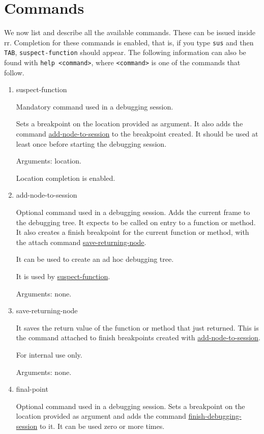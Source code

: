 \section{Commands}
We now list and describe all the available commands. These can be issued inside rr. Completion for these commands is enabled, that is, if you type \verb|sus| and then \verb|TAB|, \verb|suspect-function| should appear.
The following information can also be found with \verb|help <command>|, where \verb|<command>| is one of the commands that follow.

\begin{enumerate}
    \item suspect-function
\label{command:suspect-function}

Mandatory command used in a debugging session.

Sets a breakpoint on the location provided as argument. It also adds the command \hyperref[command:add-node-to-session]{add-node-to-session} to the breakpoint created.
It should be used at least once before starting the debugging session.

Arguments: location.

Location completion is enabled.

\item add-node-to-session
\label{command:add-node-to-session}

Optional command used in a debugging session.
Adds the current frame to the debugging tree.
It expects to be called on entry to a function or method.
It also creates a finish breakpoint for the current function or method, with the attach command \hyperref[command:save-returning-node]{save-returning-node}.

It can be used to create an ad hoc debugging tree.

It is used by \hyperref[command:suspect-function]{suspect-function}.

Arguments: none.
\item save-returning-node
\label{command:save-returning-node}

It saves the return value of the function or method that just returned.
This is the command attached to finish breakpoints created with \hyperref[command:add-node-to-session]{add-node-to-session}.

For internal use only.

Arguments: none.
\item final-point
\label{command:final-point}

Optional command used in a debugging session.
Sets a breakpoint on the location provided as argument and adds the command \hyperref[command:finish-debugging-session]{finish-debugging-session} to it.
It can be used zero or more times.


\end{enumerate}
